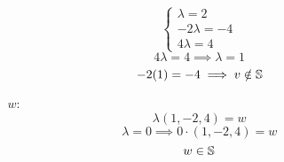 \documentclass[../practica.root.tex]{subfiles}
\begin{document}
\begin{enumerate}
\begin{enumerate}
\begin{itemize}
                              \[
                                  \begin{cases}
                                      \lambda = 2    \\
                                      -2\lambda = -4 \\
                                      4\lambda = 4
                                  \end{cases}
                              \]
                              \[ 4\lambda = 4 \implies \lambda = 1 \]
                              \[ -2(1) = -4 \implies v \notin \S \]
                        \item[$w$:] \[ \lambda(1,-2,4) = w \]
                              \[ \lambda = 0 \implies 0\cdot(1,-2,4) = w \]
                              \[ w \in \S \]
                    \end{itemize}


\end{enumerate}
\end{enumerate}
\end{document}
